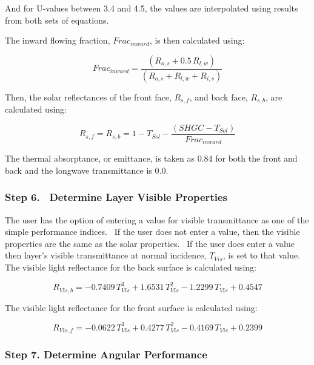 And for U-values between 3.4 and 4.5, the values are interpolated using results from both sets of equations.

The inward flowing fraction, \(Fra{c_{inward}}\), is then calculated using:

\begin{equation}
Fra{c_{inward}} = \frac{{\left( {{R_{o,s}} + 0.5\,{R_{l,w}}} \right)}}{{\left( {{R_{o,s}} + {R_{l,w}} + {R_{i,s}}} \right)}}
\end{equation}

Then, the solar reflectances of the front face, \({R_{s,f}}\), and back face, \({R_{s,b}}\), are calculated using:

\begin{equation}
{R_{s,f}} = {R_{s,b}} = 1 - {T_{Sol}} - \frac{{\left( {SHGC - {T_{Sol}}} \right)}}{{Fra{c_{inward}}}}
\end{equation}

The thermal absorptance, or emittance, is taken as 0.84 for both the front and back and the longwave transmittance is 0.0.

\subsubsection{Step 6.~ Determine Layer Visible Properties}\label{step-6.-determine-layer-visible-properties}

The user has the option of entering a value for visible transmittance as one of the simple performance indices.~ If the user does not enter a value, then the visible properties are the same as the solar properties.~ If the user does enter a value then layer's visible transmittance at normal incidence, \({T_{Vis}}\), is set to that value.~ The visible light reflectance for the back surface is calculated using:

\begin{equation}
{R_{Vis,b}} =  - 0.7409\,T_{Vis}^3 + 1.6531\,T_{Vis}^2 - 1.2299\,{T_{Vis}} + 0.4547
\end{equation}

The visible light reflectance for the front surface is calculated using:

\begin{equation}
{R_{Vis,f}} =  - 0.0622\,T_{Vis}^3 + 0.4277\,T_{Vis}^2 - 0.4169\,{T_{Vis}} + 0.2399
\end{equation}

\subsubsection{Step 7. Determine Angular Performance}\label{step-7.-determine-angular-performance}


